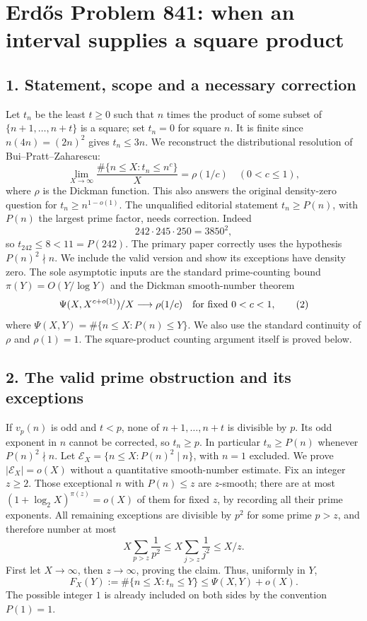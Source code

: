 \section*{Erd\H{o}s Problem 841: when an interval supplies a square product}
\subsection*{1. Statement, scope and a necessary correction}
Let $t_n$ be the least $t\ge0$ such that $n$ times the product of some subset of $\{n+1,\ldots,n+t\}$ is a square; set $t_n=0$ for square $n$. It is finite since $n(4n)=(2n)^2$ gives $t_n\le3n$. We reconstruct the distributional resolution of Bui--Pratt--Zaharescu:
\[
 \lim_{X\to\infty}\frac{\#\{n\le X:t_n\le n^c\}}X
 =\rho(1/c)\quad(0<c\le1),                              \tag{1}
\]
where $\rho$ is the Dickman function. This also answers the original density-zero question for $t_n\ge n^{1-o(1)}$.
The unqualified editorial statement $t_n\ge P(n)$, with $P(n)$ the largest prime factor, needs correction. Indeed
\[
 242\cdot245\cdot250=3850^2,
\]
so $t_{242}\le8<11=P(242)$. The primary paper correctly uses the hypothesis $P(n)^2\nmid n$. We include the valid version and show its exceptions have density zero.
The sole asymptotic inputs are the standard prime-counting bound $\pi(Y)=O(Y/\log Y)$ and the Dickman smooth-number theorem
\[
 \Psi(X,X^{c+o(1)})/X\longrightarrow\rho(1/c)
 \quad\hbox{for fixed }0<c<1,                            \tag{2}
\]
where $\Psi(X,Y)=\#\{n\le X:P(n)\le Y\}$. We also use the standard continuity of $\rho$ and $\rho(1)=1$. The square-product counting argument itself is proved below.
\subsection*{2. The valid prime obstruction and its exceptions}
If $v_p(n)$ is odd and $t<p$, none of $n+1,\ldots,n+t$ is divisible by $p$. Its odd exponent in $n$ cannot be corrected, so $t_n\ge p$. In particular $t_n\ge P(n)$ whenever $P(n)^2\nmid n$.
Let $\mathcal E_X=\{n\le X:P(n)^2\mid n\}$, with $n=1$ excluded. We prove $|\mathcal E_X|=o(X)$ without a quantitative smooth-number estimate. Fix an integer $z\ge2$. Those exceptional $n$ with $P(n)\le z$ are $z$-smooth; there are at most $(1+\log_2 X)^{\pi(z)}=o(X)$ of them for fixed $z$, by recording all their prime exponents. All remaining exceptions are divisible by $p^2$ for some prime $p>z$, and therefore number at most
\[
 X\sum_{p>z}\frac1{p^2}\le X\sum_{j>z}\frac1{j^2}\le X/z.
\]
First let $X\to\infty$, then $z\to\infty$, proving the claim. Thus, uniformly in $Y$,
\[
 F_X(Y):=\#\{n\le X:t_n\le Y\}\le\Psi(X,Y)+o(X).          \tag{3}
\]
The possible integer $1$ is already included on both sides by the convention $P(1)=1$.
